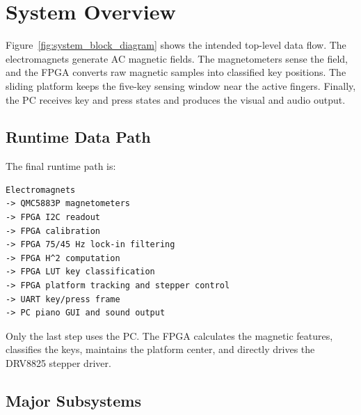 \section{System Overview}
\label{sec:system_overview}

Figure~\ref{fig:system_block_diagram} shows the intended top-level data flow. The electromagnets generate AC magnetic fields. The magnetometers sense the field, and the FPGA converts raw magnetic samples into classified key positions. The sliding platform keeps the five-key sensing window near the active fingers. Finally, the PC receives key and press states and produces the visual and audio output.


\subsection{Runtime Data Path}

The final runtime path is:

\begin{lstlisting}
Electromagnets
-> QMC5883P magnetometers
-> FPGA I2C readout
-> FPGA calibration
-> FPGA 75/45 Hz lock-in filtering
-> FPGA H^2 computation
-> FPGA LUT key classification
-> FPGA platform tracking and stepper control
-> UART key/press frame
-> PC piano GUI and sound output
\end{lstlisting}

Only the last step uses the PC. The FPGA calculates the magnetic features, classifies the keys, maintains the platform center, and directly drives the DRV8825 stepper driver.

\subsection{Major Subsystems}

